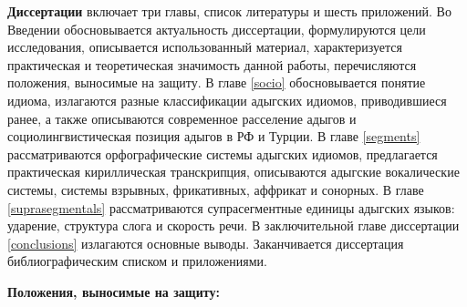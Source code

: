 \documentclass[russian,]{book}
\begin{document}
\textbf{Диссертации} включает три главы, список литературы и шесть
приложений. Во Введении обосновывается актуальность диссертации,
формулируются цели исследования, описывается использованный материал,
характеризуется практическая и теоретическая значимость данной работы,
перечисляются положения, выносимые на защиту. В главе \ref{socio}
обосновывается понятие идиома, излагаются разные классификации адыгских
идиомов, приводившиеся ранее, а также описываются современное расселение
адыгов и социолингвистическая позиция адыгов в РФ и Турции. В главе
\ref{segments} рассматриваются орфографические системы адыгских идиомов,
предлагается практическая кириллическая транскрипция, описываются
адыгские вокалические системы, системы взрывных, фрикативных, аффрикат и
сонорных. В главе \ref{suprasegmentals} рассматриваются супрасегментные
единицы адыгских языков: ударение, структура слога и скорость речи. В
заключительной главе диссертации \ref{conclusions} излагаются основные
выводы. Заканчивается диссертация библиографическим списком и
приложениями.

\textbf{Положения, выносимые на защиту:}
\end{document}
